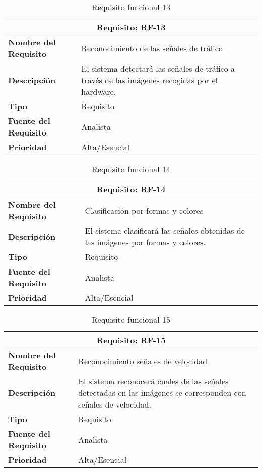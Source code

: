 \begin{table}[H]
\begin{center}
\begin{tabular}{p{} p{7cm}}
\multicolumn{2}{c}{\textbf{Requisito: RF-13} } \\
\hline \hline
\textbf{Nombre del Requisito} & Reconocimiento de las señales de tráfico \\
\hline
\textbf{Descripción} & El sistema detectará las señales de tráfico a través de las imágenes recogidas por el hardware. \\
\hline
\textbf{Tipo} & Requisito  \\
\hline
\textbf{Fuente del Requisito} & Analista  \\
\hline
\textbf{Prioridad} & Alta/Esencial  \\ \hline
\end{tabular}
\caption{Requisito funcional 13}
\label{tab:RF-13}
\end{center}
\end{table}

\begin{table}[H]
\begin{center}
\begin{tabular}{p{} p{7cm}}
\multicolumn{2}{c}{\textbf{Requisito: RF-14} } \\
\hline \hline
\textbf{Nombre del Requisito} &  Clasificación por formas y colores\\
\hline
\textbf{Descripción} & El sistema clasificará las señales obtenidas de las imágenes por formas y colores.\\
\hline
\textbf{Tipo} & Requisito \\
\hline
\textbf{Fuente del Requisito} & Analista \\
\hline
\textbf{Prioridad} & Alta/Esencial \\ \hline
\end{tabular}
\caption{Requisito funcional 14}
\label{tab:RF-14}
\end{center}
\end{table}

\begin{table}[H]
\begin{center}
\begin{tabular}{p{} p{7cm}}
\multicolumn{2}{c}{\textbf{Requisito: RF-15} } \\
\hline \hline
\textbf{Nombre del Requisito} &  Reconocimiento señales de velocidad \\
\hline
\textbf{Descripción} & El sistema reconocerá cuales de las señales detectadas en las imágenes se corresponden con señales de velocidad.
\\
\hline
\textbf{Tipo} & Requisito \\
\hline
\textbf{Fuente del Requisito} & Analista \\
\hline
\textbf{Prioridad} & Alta/Esencial \\ \hline
\end{tabular}
\caption{Requisito funcional 15}
\label{tab:RF-15}
\end{center}
\end{table}

